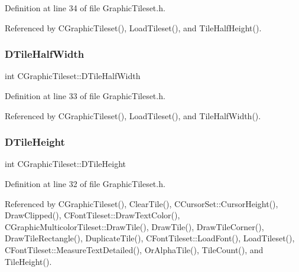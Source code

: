 Definition at line 34 of file Graphic\+Tileset.\+h.



Referenced by C\+Graphic\+Tileset(), Load\+Tileset(), and Tile\+Half\+Height().

\hypertarget{classCGraphicTileset_a3e82808009078ce29f6b74bcd077b251}{}\label{classCGraphicTileset_a3e82808009078ce29f6b74bcd077b251} 
\subsubsection{\texorpdfstring{D\+Tile\+Half\+Width}{DTileHalfWidth}}
{\footnotesize\ttfamily int C\+Graphic\+Tileset\+::\+D\+Tile\+Half\+Width\hspace{0.3cm}{\ttfamily [protected]}}



Definition at line 33 of file Graphic\+Tileset.\+h.



Referenced by C\+Graphic\+Tileset(), Load\+Tileset(), and Tile\+Half\+Width().

\hypertarget{classCGraphicTileset_af48f32e07d5fe69afd5f764318cc3244}{}\label{classCGraphicTileset_af48f32e07d5fe69afd5f764318cc3244} 
\subsubsection{\texorpdfstring{D\+Tile\+Height}{DTileHeight}}
{\footnotesize\ttfamily int C\+Graphic\+Tileset\+::\+D\+Tile\+Height\hspace{0.3cm}{\ttfamily [protected]}}



Definition at line 32 of file Graphic\+Tileset.\+h.



Referenced by C\+Graphic\+Tileset(), Clear\+Tile(), C\+Cursor\+Set\+::\+Cursor\+Height(), Draw\+Clipped(), C\+Font\+Tileset\+::\+Draw\+Text\+Color(), C\+Graphic\+Multicolor\+Tileset\+::\+Draw\+Tile(), Draw\+Tile(), Draw\+Tile\+Corner(), Draw\+Tile\+Rectangle(), Duplicate\+Tile(), C\+Font\+Tileset\+::\+Load\+Font(), Load\+Tileset(), C\+Font\+Tileset\+::\+Measure\+Text\+Detailed(), Or\+Alpha\+Tile(), Tile\+Count(), and Tile\+Height().


